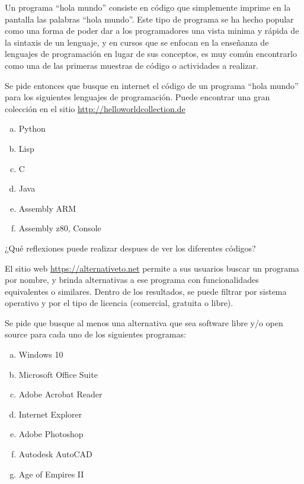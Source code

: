 \begin{exercise}
Un programa ``hola mundo'' consiste en código que simplemente imprime en la
pantalla las palabras ``hola mundo''. Este tipo de programa se ha hecho popular
como una forma de poder dar a los programadores una vista minima y rápida de
la sintaxis de un lenguaje, y en cursos que se enfocan en la enseñanza de lenguajes
de programación en lugar de sus conceptos, es muy común encontrarlo como una de
las primeras muestras de código o actividades a realizar.

Se pide entonces que busque en internet el código de un programa ``hola mundo''
para los siguientes lenguajes de programación. Puede encontrar una gran colección
en el sitio \href{http://helloworldcollection.de}{http://helloworldcollection.de}

\begin{enumerate}[a)]
    \item Python
    \item Lisp
    \item C
    \item Java
    \item Assembly ARM
    \item Assembly z80, Console
\end{enumerate}

¿Qué reflexiones puede realizar despues de ver los diferentes códigos?
\end{exercise}

\begin{exercise}
El sitio web \href{https://alternativeto.net}{https://alternativeto.net} permite
a sus usuarios buscar un programa por nombre, y brinda alternativas a ese programa
con funcionalidades equivalentes o similares. Dentro de los resultados, se puede
filtrar por sistema operativo y por el tipo de licencia (comercial, gratuita o libre).

Se pide que busque al menos una alternativa que sea software libre y/o open
source para cada uno de los siguientes programas:
\begin{enumerate}[a)]
    \item Windows 10
    \item Microsoft Office Suite
    \item Adobe Acrobat Reader
    \item Internet Explorer
    \item Adobe Photoshop
    \item Autodesk AutoCAD
    \item Age of Empires II
\end{enumerate}
\end{exercise}